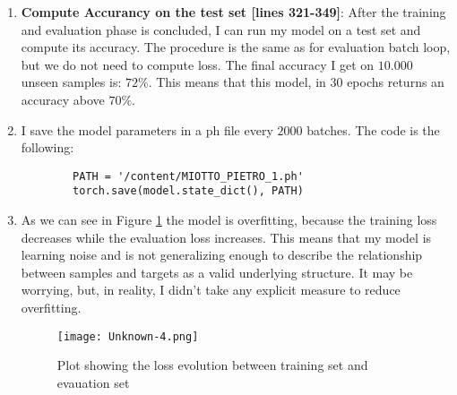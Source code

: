 \documentclass[a4paper]{article}
\begin{document}
\begin{enumerate}
	\item \textbf{Compute Accurancy on the test set [lines 321-349]}: After the training and evaluation phase is concluded, I can run my model on a test set and compute its accuracy. The procedure is the same as for evaluation batch loop, but we do not need to compute loss. The final accuracy I get on $10.000$ unseen samples is: $72\%$. This means that this model, in 30 epochs returns an accuracy above $70\%$. 
	\item I save the model parameters in a ph file every $2000$ batches. The code is the following:
    \begin{lstlisting}
        PATH = '/content/MIOTTO_PIETRO_1.ph'
        torch.save(model.state_dict(), PATH)
    \end{lstlisting}
    \item As we can see in Figure \ref{fig:lossplot} the model is overfitting, because the training loss decreases while the evaluation loss increases. This means that my model is learning noise and is not generalizing enough to describe the relationship between samples and targets as a valid underlying structure. It may be worrying, but, in reality, I didn't take any explicit measure to reduce overfitting. 

    \begin{figure}[h]
        \centering
        \texttt{[image: Unknown-4.png]}
        \caption{Plot showing the loss evolution between training set and evauation set}
        \label{fig:lossplot}
    \end{figure}


\end{enumerate}
\end{document}
